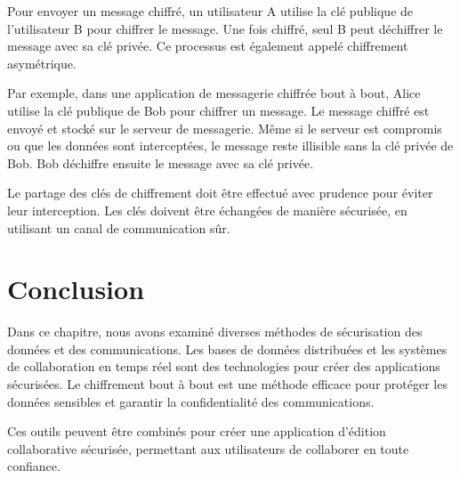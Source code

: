 Pour envoyer un message chiffré, un utilisateur A utilise la clé publique de l'utilisateur B pour chiffrer le message. Une fois chiffré, seul B peut déchiffrer le message avec sa clé privée. Ce processus est également appelé chiffrement asymétrique.

Par exemple, dans une application de messagerie chiffrée bout à bout, Alice utilise la clé publique de Bob pour chiffrer un message. Le message chiffré est envoyé et stocké sur le serveur de messagerie. Même si le serveur est compromis ou que les données sont interceptées, le message reste illisible sans la clé privée de Bob. Bob déchiffre ensuite le message avec sa clé privée.

Le partage des clés de chiffrement doit être effectué avec prudence pour éviter leur interception. Les clés doivent être échangées de manière sécurisée, en utilisant un canal de communication sûr.

\section{Conclusion}
Dans ce chapitre, nous avons examiné diverses méthodes de sécurisation des données et des communications. Les bases de données distribuées et les systèmes de collaboration en temps réel sont des technologies pour créer des applications sécurisées. Le chiffrement bout à bout est une méthode efficace pour protéger les données sensibles et garantir la confidentialité des communications.

Ces outils peuvent être combinés pour créer une application d'édition collaborative sécurisée, permettant aux utilisateurs de collaborer en toute confiance.